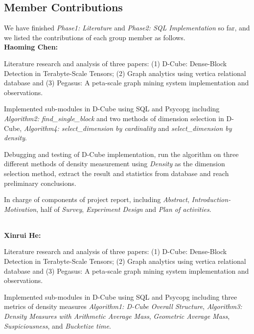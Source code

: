 
\subsection{Member Contributions}

We have finished \textit{Phase1: Literature} and \textit{Phase2: SQL Implementation} so far, and we listed the contributions of each group member as follows. \\

\textbf{Haoming Chen:}
\bit
\setlength\itemsep{1em}
\item Literature research and analysis of three papers: (1) D-Cube: Dense-Block Detection in Terabyte-Scale Tensors\cite{shin2017d}; (2) Graph analytics using vertica relational database\cite{jindal2015graph} and (3) Pegasus: A peta-scale graph mining system implementation and observations\cite{kang2009pegasus}.

\item Implemented sub-modules in D-Cube using SQL and Psycopg including \textit{Algorithm2: find\_single\_block} and two methods of dimension selection in D-Cube, \textit{Algorithm4: select\_dimension by cardinality} and 
\textit{select\_dimension by density}.

\item Debugging and testing of D-Cube implementation, run the algorithm on three different methods of density measurement using \textit{Density} as the dimension selection method, extract the result and statistics from database and reach preliminary conclusions. 

\item In charge of components of project report, including \textit{Abstract}, \textit{Introduction-Motivation}, half of \textit{Survey}, \textit{Experiment Design} and \textit{Plan of activities}.
\eit

\\
\textbf{Xinrui He:}
\bit
\setlength\itemsep{1em}
\item Literature research and analysis of three papers: (1) D-Cube: Dense-Block Detection in Terabyte-Scale Tensors\cite{shin2017d}; (2) Graph analytics using vertica relational database\cite{jindal2015graph} and (3) Pegasus: A peta-scale graph mining system implementation and observations\cite{kang2009pegasus}.

\item Implemented sub-modules in D-Cube using SQL and Psycopg including three metrics of density measures \textit{Algorithm1: D-Cube Overall Structure}, \textit{Algorithm3: Density Measures with Arithmetic Average Mass}, \textit{Geometric Average Mass}, \textit{Suspiciousness}, and \textit{Bucketize time}.

